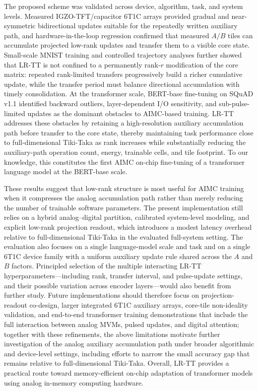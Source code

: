 \documentclass[AMA,LATO2COL]{WileyNJDv5}
\begin{document}
The proposed scheme was validated across device, algorithm, task, and system levels. Measured IGZO-TFT/capacitor 6T1C arrays provided gradual and near-symmetric bidirectional updates suitable for the repeatedly written auxiliary path, and hardware-in-the-loop regression confirmed that measured \(A/B\) tiles can accumulate projected low-rank updates and transfer them to a visible core state. Small-scale MNIST training and controlled trajectory analyses further showed that LR-TT is not confined to a permanently rank-\(r\) modification of the core matrix: repeated rank-limited transfers progressively build a richer cumulative update, while the transfer period must balance directional accumulation with timely consolidation. At the transformer scale, BERT-base fine-tuning on SQuAD v1.1 identified backward outliers, layer-dependent I/O sensitivity, and sub-pulse-limited updates as the dominant obstacles to AIMC-based training. LR-TT addresses these obstacles by retaining a high-resolution auxiliary accumulation path before transfer to the core state, thereby maintaining task performance close to full-dimensional Tiki-Taka as rank increases while substantially reducing the auxiliary-path operation count, energy, trainable cells, and tile footprint.
To our knowledge, this constitutes the first AIMC on-chip fine-tuning of a transformer language model at the BERT-base scale.

These results suggest that low-rank structure is most useful for AIMC training when it compresses the analog accumulation path rather than merely reducing the number of trainable software parameters. The present implementation still relies on a hybrid analog--digital partition, calibrated system-level modeling, and explicit low-rank projection readout, which introduces a modest latency overhead relative to full-dimensional Tiki-Taka in the evaluated full-system setting. The evaluation also focuses on a single language-model scale and task and on a single 6T1C device family with a uniform auxiliary update rule shared across the \(A\) and \(B\) factors. Principled selection of the multiple interacting LR-TT hyperparameters---including rank, transfer interval, and pulse-update settings, and their possible variation across encoder layers---would also benefit from further study. Future implementations should therefore focus on projection-readout co-design, larger integrated 6T1C auxiliary arrays, core-tile non-ideality validation, and end-to-end transformer training demonstrations that include the full interaction between analog MVMs, pulsed updates, and digital attention; together with these refinements, the above limitations motivate further investigation of the analog auxiliary accumulation path under broader algorithmic and device-level settings, including efforts to narrow the small accuracy gap that remains relative to full-dimensional Tiki-Taka. Overall, LR-TT provides a practical route toward memory-efficient on-chip adaptation of transformer models using analog in-memory computing hardware.
\end{document}
